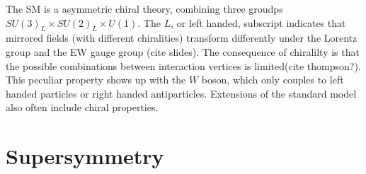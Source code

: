 The SM is a asymmetric chiral theory, combining three groudps $SU(3)_L \times SU(2)_L \times U(1)$. The $L$, or left handed, subscript indicates that mirrored fields (with different chiralities)  transform differently under the Lorentz group and the EW gauge group (cite slides).  The consequence of chiralilty is that the possible combinations between interaction vertices is limited(cite thompson?). This peculiar property shows up with the $W$ boson, which only couples to left handed particles or right handed antiparticles. Extensions of the standard model also often include chiral properties.  %

\section{Supersymmetry}

